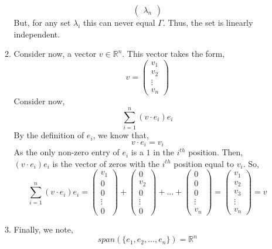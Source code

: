 \documentclass[letterpaper,10pt]{article}
\newcommand{\R}{\mathbb{R}}
\begin{document}
\begin{enumerate}
\begin{enumerate}
\[\begin{pmatrix}
\lambda_n
\end{pmatrix}\]
But, for any set $\lambda_i$ this can never equal $\Gamma$. Thus, the set is linearly independent.
\item Consider now, a vector $v\in \R^n$. This vector takes the form,
\[v=\begin{pmatrix}
v_1\\ v_2\\ \vdots \\v_n
\end{pmatrix}\]
Consider now,
\[\sum_{i=1}^n(v\cdot e_i)e_i\]
By the definition of $e_i$, we know that,
\[v\cdot e_i=v_i\]
As the only non-zero entry of $e_i$ is a $1$ in the $i^{th}$ position. Then, $(v\cdot e_i)e_i$ is the vector of zeros with the $i^{th}$ position equal to $v_i$. So,
\[\sum_{i=1}^n(v\cdot e_i)e_i=\begin{pmatrix}
v_1\\0\\0\\\vdots \\0
\end{pmatrix}+\begin{pmatrix}
0\\v_2\\0\\\vdots\\0
\end{pmatrix}+\ldots+\begin{pmatrix}
0\\0\\0\\\vdots\\v_n
\end{pmatrix}=\begin{pmatrix}
v_1\\v_2\\v_3\\\vdots\\v_n
\end{pmatrix}=v \]
\item Finally, we note,
\[span(\{e_1,e_2,\ldots,e_n\})=\R^n\]
\end{enumerate}
\end{enumerate}
\end{document}
